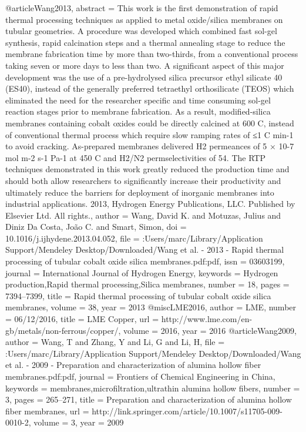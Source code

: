 @article{Wang2013,
abstract = {This work is the first demonstration of rapid thermal processing techniques as applied to metal oxide/silica membranes on tubular geometries. A procedure was developed which combined fast sol-gel synthesis, rapid calcination steps and a thermal annealing stage to reduce the membrane fabrication time by more than two-thirds, from a conventional process taking seven or more days to less than two. A significant aspect of this major development was the use of a pre-hydrolysed silica precursor ethyl silicate 40 (ES40), instead of the generally preferred tetraethyl orthosilicate (TEOS) which eliminated the need for the researcher specific and time consuming sol-gel reaction stages prior to membrane fabrication. As a result, modified-silica membranes containing cobalt oxides could be directly calcined at 600 C, instead of conventional thermal process which require slow ramping rates of ≤1 C min-1 to avoid cracking. As-prepared membranes delivered H2 permeances of 5 × 10-7 mol m-2 s-1 Pa-1 at 450 C and H2/N2 permselectivities of 54. The RTP techniques demonstrated in this work greatly reduced the production time and should both allow researchers to significantly increase their productivity and ultimately reduce the barriers for deployment of inorganic membranes into industrial applications. {\textcopyright} 2013, Hydrogen Energy Publications, LLC. Published by Elsevier Ltd. All rights.},
author = {Wang, David K. and Motuzas, Julius and {Diniz Da Costa}, Jo{\~{a}}o C. and Smart, Simon},
doi = {10.1016/j.ijhydene.2013.04.052},
file = {:Users/marc/Library/Application Support/Mendeley Desktop/Downloaded/Wang et al. - 2013 - Rapid thermal processing of tubular cobalt oxide silica membranes.pdf:pdf},
issn = {03603199},
journal = {International Journal of Hydrogen Energy},
keywords = {Hydrogen production,Rapid thermal processing,Silica membranes},
number = {18},
pages = {7394--7399},
title = {{Rapid thermal processing of tubular cobalt oxide silica membranes}},
volume = {38},
year = {2013}
}
@misc{LME2016,
author = {LME},
number = {06/12/2016},
title = {{LME Copper}},
url = {http://www.lme.com/en-gb/metals/non-ferrous/copper/},
volume = {2016},
year = {2016}
}
@article{Wang2009,
author = {Wang, T and Zhang, Y and Li, G and Li, H},
file = {:Users/marc/Library/Application Support/Mendeley Desktop/Downloaded/Wang et al. - 2009 - Preparation and characterization of alumina hollow fiber membranes.pdf:pdf},
journal = {Frontiers of Chemical Engineering in China},
keywords = {membranes,microfiltration,ultrathin alumina hollow fibers},
number = {3},
pages = {265--271},
title = {{Preparation and characterization of alumina hollow fiber membranes}},
url = {http://link.springer.com/article/10.1007/s11705-009-0010-2},
volume = {3},
year = {2009}
}
